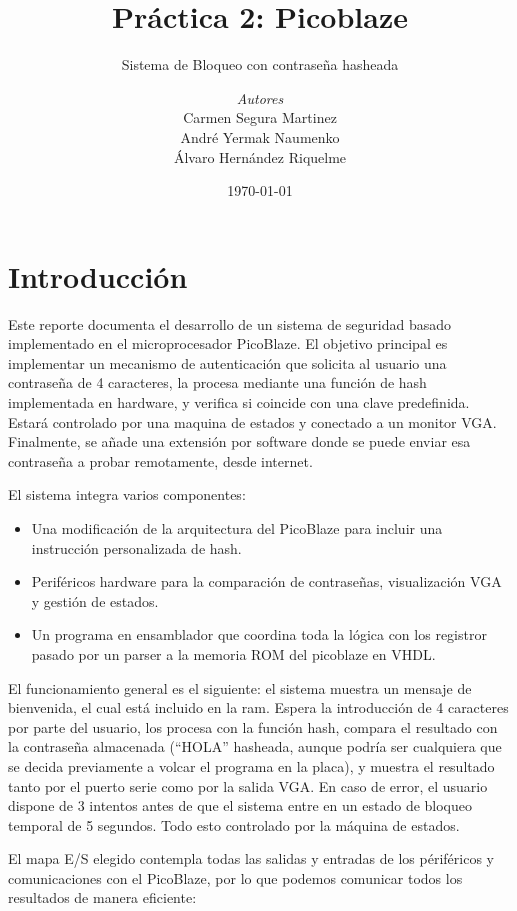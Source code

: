 \documentclass[a4paper, 12pt]{report}
\institute{Universidad Politécnica de Cartagena}
\title{Práctica 2: Picoblaze}
\subtitle{Sistema de Bloqueo con contraseña hasheada}
\author{\textit{Autores}\\ Carmen Segura Martinez \\ André Yermak Naumenko \\ Álvaro Hernández Riquelme }
\date{\today}
\begin{document}
\maketitle
\romantableofcontents
\setcounter{section}{0}

\chapter{Introducción}

Este reporte documenta el desarrollo de un sistema de seguridad basado implementado en el microprocesador PicoBlaze. El objetivo principal es implementar un mecanismo de autenticación que solicita al usuario una contraseña de 4 caracteres, la procesa mediante una función de hash implementada en hardware, y verifica si coincide con una clave predefinida. Estará controlado por una maquina de estados y conectado a un monitor VGA. Finalmente, se añade una extensión por software donde se puede enviar esa contraseña a probar remotamente, desde internet.

El sistema integra varios componentes:
\begin{itemize}
    \item Una modificación de la arquitectura del PicoBlaze para incluir una instrucción personalizada de hash.
    \item Periféricos hardware para la comparación de contraseñas, visualización VGA y gestión de estados.
    \item Un programa en ensamblador que coordina toda la lógica con los registror pasado por un parser a la memoria ROM del picoblaze en VHDL.
\end{itemize}

El funcionamiento general es el siguiente: el sistema muestra un mensaje de bienvenida, el cual está incluido en la ram. Espera la introducción de 4 caracteres por parte del usuario, los procesa con la función hash, compara el resultado con la contraseña almacenada (``HOLA'' hasheada, aunque podría ser cualquiera que se decida previamente a volcar el programa en la placa), y muestra el resultado tanto por el puerto serie como por la salida VGA. En caso de error, el usuario dispone de 3 intentos antes de que el sistema entre en un estado de bloqueo temporal de 5 segundos. Todo esto controlado por la máquina de estados.

El mapa E/S elegido contempla todas las salidas y entradas de los périféricos y comunicaciones con el PicoBlaze, por lo que podemos comunicar todos los resultados de manera eficiente:
\end{document}
